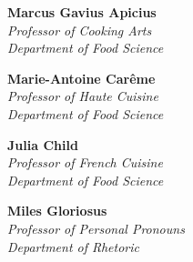 %
%


\NewDocumentCommand\CommitteePageTitle{m}{
	\vspace*{75pt}%
	\IfPackageLoadedTF{microtype}
		{\textls*{\Large\textbf{\MakeUppercase{#1}}}}
		{{\Large\textbf{\MakeUppercase{#1}}}}%
	\pdfbookmark[0]{#1}{Committee}%
	\vspace*{10pt}%
}

\NewDocumentCommand\Role{m}{
	\vspace*{50pt}%
	\IfPackageLoadedTF{microtype}
		{\textls*{\large{\textsc{#1}}}}
		{{\large\textsc{#1}}}%
	\vspace*{12pt}%
}


\begin{flushright}


\Role{  }

 \textbf{Marcus Gavius Apicius} \\
 {\itshape
 Professor of Cooking Arts \\
 Department of Food Science \\
 }


 \textbf{Marie-Antoine Carême} \\
 {\itshape
   Professor of Haute Cuisine \\
   Department of Food Science \\[18pt]
 }

 \textbf{Julia Child}\\
 {\itshape
   Professor of French Cuisine \\
   Department of Food Science \\[18pt]
 }

 \textbf{Miles Gloriosus} \\
 {\itshape
   Professor of Personal Pronouns \\
   Department of Rhetoric \\
 }

\end{flushright}

\cleardoublepage
